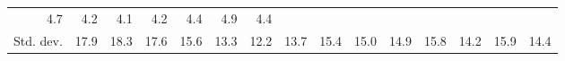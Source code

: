 \begin{tabular}{lllllllllllllll}
  \multicolumn{1}{r}{4.7} &
  \multicolumn{1}{r}{4.2} &
  \multicolumn{1}{r}{4.1} &
  \multicolumn{1}{r}{4.2} &
  \multicolumn{1}{r}{4.4} &
  \multicolumn{1}{r}{4.9} &
  \multicolumn{1}{r}{4.4} \\
\multicolumn{1}{l}{\hspace{2em}Std. dev.} &
  \multicolumn{1}{|r}{17.9} &
  \multicolumn{1}{r}{18.3} &
  \multicolumn{1}{r}{17.6} &
  \multicolumn{1}{r}{15.6} &
  \multicolumn{1}{r}{13.3} &
  \multicolumn{1}{r}{12.2} &
  \multicolumn{1}{r}{13.7} &
  \multicolumn{1}{r}{15.4} &
  \multicolumn{1}{r}{15.0} &
  \multicolumn{1}{r}{14.9} &
  \multicolumn{1}{r}{15.8} &
  \multicolumn{1}{r}{14.2} &
  \multicolumn{1}{r}{15.9} &
  \multicolumn{1}{r}{14.4} \\
\cline{1-15}
\end{tabular}
